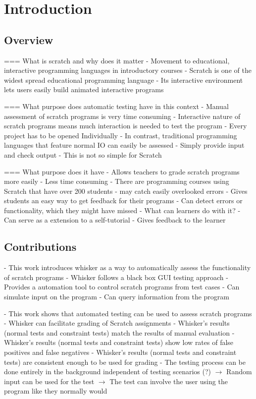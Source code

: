 \chapter{Introduction}

\section{Overview}
=== What is scratch and why does it matter
- Movement to educational, interactive programming languages in introductory courses
- Scratch is one of the widest spread educational programming language
- Its interactive environment lets users easily build animated interactive programs

=== What purpose does automatic testing have in this context
- Manual assessment of scratch programs is very time consuming
- Interactive nature of scratch programs means much interaction is needed to test the program
- Every project has to be opened Individually
- In contrast, traditional programming languages that feature normal IO can easily be assessed
- Simply provide input and check output
- This is not so simple for Scratch

=== What purpose does it have
- Allows teachers to grade scratch programs more easily
    - Less time consuming
        - There are programming courses using Scratch that have over 200 students \cite{itch}
    - may catch easily overlooked errors
    - Gives students an easy way to get feedback for their programs
        - Can detect errors or functionality, which they might have missed
- What can learners do with it?
    - Can serve as a extension to a self-tutorial
    - Gives feedback to the learner

\section{Contributions}
- This work introduces whisker as a way to automatically assess the functionality of scratch programs
- Whisker follows a black box GUI testing approach
- Provides a automation tool to control scratch programs from test cases
    - Can simulate input on the program
    - Can query information from the program

- This work shows that automated testing can be used to assess scratch programs
- Whisker can facilitate grading of Scratch assignments
    - Whisker's results (normal tests and constraint tests) match the results of manual evaluation
    - Whisker's results (normal tests and constraint tests) show low rates of false positives and false negatives
    - Whisker's results (normal tests and constraint tests) are consistent enough to be used for grading
- The testing process can be done entirely in the background independent of testing scenarios (?)
    $\rightarrow$ Random input can be used for the test
    $\rightarrow$ The test can involve the user using the program like they normally would

